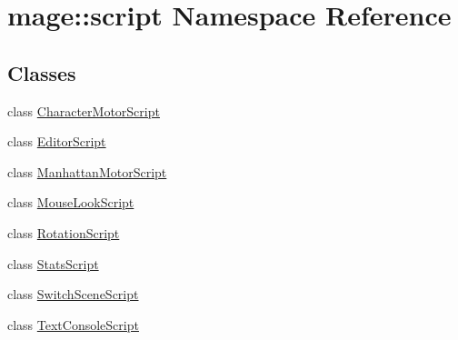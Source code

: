 \hypertarget{namespacemage_1_1script}{}\section{mage\+:\+:script Namespace Reference}
\label{namespacemage_1_1script}
\subsection*{Classes}
\begin{DoxyCompactItemize}
\item 
class \hyperlink{classmage_1_1script_1_1_character_motor_script}{Character\+Motor\+Script}
\item 
class \hyperlink{classmage_1_1script_1_1_editor_script}{Editor\+Script}
\item 
class \hyperlink{classmage_1_1script_1_1_manhattan_motor_script}{Manhattan\+Motor\+Script}
\item 
class \hyperlink{classmage_1_1script_1_1_mouse_look_script}{Mouse\+Look\+Script}
\item 
class \hyperlink{classmage_1_1script_1_1_rotation_script}{Rotation\+Script}
\item 
class \hyperlink{classmage_1_1script_1_1_stats_script}{Stats\+Script}
\item 
class \hyperlink{classmage_1_1script_1_1_switch_scene_script}{Switch\+Scene\+Script}
\item 
class \hyperlink{classmage_1_1script_1_1_text_console_script}{Text\+Console\+Script}
\end{DoxyCompactItemize}
